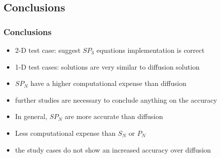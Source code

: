 \subsection{Conclusions}
\begin{frame}
\frametitle{Conclusions}

    \begin{itemize}
        \item 2-D test case: suggest $SP_3$ equations implementation is correct
        \item 1-D test cases: solutions are very similar to diffusion solution
        \item $SP_N$ have a higher computational expense than diffusion
        \item further studies are necessary to conclude anything on the accuracy
        \item In general, $SP_N$ are more accurate than diffusion \cite{brantley_simplifiedP3_2000}
        \item Less computational expense than $S_N$ or $P_N$
        \item the study cases do not show an increased accuracy over diffusion
    \end{itemize}
\end{frame}
